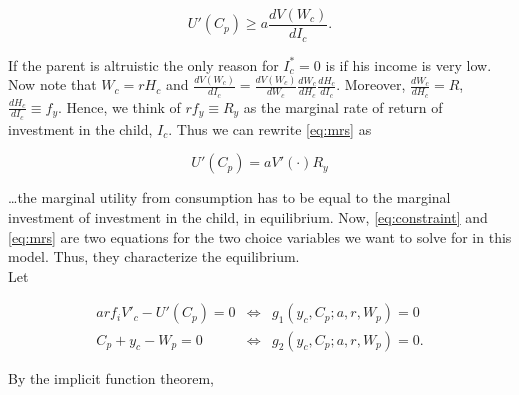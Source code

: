 \begin{equation}
U'(C_{p}) \geq a \frac{d V(W_{c})}{d I_{c}}. \label{eq:mrs}
\end{equation}

\noindent If the parent is altruistic the only reason for $I_{c}^* = 0$ is if his income is very low. Now note that $W_{c} = r H_{c}$ and $\frac{d V(W_{c})}{d I_{c}} = \frac{d V(W_{c})}{d W_{c}} \frac{d W_{c}}{d H_{c}} \frac{d H_{c}}{d I_{c}}$. Moreover, $\frac{d W_{c}}{d H_{c}} = R$, $\frac{d H_{c}}{d I_{c}} \equiv f_{y}$. Hence, we think of $r f_{y} \equiv R_{y}$ as the marginal rate of return of investment in the child, $I_{c}$. Thus we can rewrite \eqref{eq:mrs} as

\begin{equation}
U'(C_{p}) = a V'(\cdot) R_{y}
\end{equation}

\noindent \ldots the marginal utility from consumption has to be equal to the marginal investment of investment in the child, in equilibrium. Now, \eqref{eq:constraint} and \eqref{eq:mrs} are two equations for the two choice variables we want to solve for in this model. Thus, they characterize the equilibrium.\\
\indent Let

\begin{eqnarray}
a r f_i V'_{c} - U'(C_p) = 0 &\Leftrightarrow& g_1 (y_c, C_p; a, r, W_p) = 0 \label{eq:g1} \\
C_p + y_c - W_p = 0 &\Leftrightarrow& g_2 (y_c, C_p; a, r, W_p) = 0.  \label{eq:g2} 
\end{eqnarray}

\noindent By the implicit function theorem,

